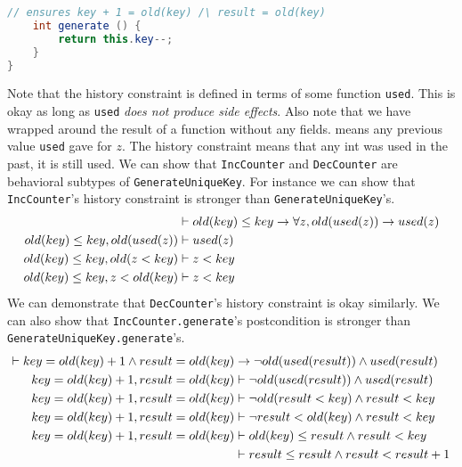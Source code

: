 \documentclass{article}
\begin{document}
\begin{example}
\begin{lstlisting}[language=Java, escapechar=|]
    // ensures key + 1 = old(key) /\ result = old(key)
    int generate () {
        return this.key--;
    }
}
\end{lstlisting}
  Note that the history constraint is defined in terms of some function \texttt{used}.
  This is okay as long as \texttt{used} \textit{does not produce side effects}.
  Also note that we have \old{} wrapped around the result of a function without any fields.
   means any previous value \texttt{used} gave for $z$.
  The history constraint means that any int was used in the past, it is still used.
  We can show that \texttt{IncCounter} and \texttt{DecCounter} are behavioral subtypes of \texttt{GenerateUniqueKey}.
  For instance we can show that \texttt{IncCounter}'s history constraint is stronger than \texttt{GenerateUniqueKey}'s.
  \begin{align*}
    &\vdash old(key) \leq key \rightarrow \forall z, old(used(z)) \rightarrow used(z) \\
    old(key) \leq key, old(used(z)) &\vdash used(z) \\
    old(key) \leq key, old(z < key) &\vdash z < key \\
    old(key) \leq key, z < old(key) &\vdash z < key \\
  \end{align*}
  We can demonstrate that \texttt{DecCounter}'s history constraint is okay similarly.
  We can also show that \texttt{IncCounter.generate}'s postcondition is stronger than \texttt{GenerateUniqueKey.generate}'s.
  \begin{align*}
    \vdash key = old(key) + 1 \wedge result = old(key) &\rightarrow \neg old(used(result)) \wedge used(result) \\
    key = old(key) + 1, result = old(key) &\vdash \neg old(used(result)) \wedge used(result) \\
    key = old(key) + 1, result = old(key) &\vdash \neg old(result < key) \wedge result < key \\
    key = old(key) + 1, result = old(key) &\vdash \neg result < old(key) \wedge result < key \\
    key = old(key) + 1, result = old(key) &\vdash  old(key) \leq result \wedge result < key \\
    &\vdash result \leq result \wedge result < result + 1
  \end{align*}
\end{example}
\end{document}

